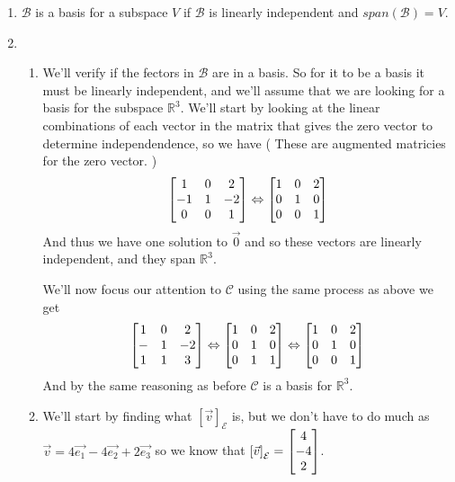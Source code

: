 \documentclass[11pt]{book}
\begin{document}
\begin{enumerate}
    \item $\mathcal{B}$ is a basis for a subspace $V$ if $\mathcal{B}$ is linearly independent and $\mathit{span} {\left( \mathcal{B} \right)}  = V$. 
    \item 
        \begin{enumerate}
            \item We'll verify if the fectors in $\mathcal{B}$ are in a basis. So for it to be a basis it must be linearly independent, and we'll assume that we are looking for a basis for the subspace $\mathbb{R}^{3}$. We'll start by looking at the linear combinations of each vector in the matrix that gives the zero vector to determine independendence, so we have ( These are augmented matricies for the zero vector. )
                \begin{gather*}
                    \begin{bmatrix} 1 & 0 & 2 \\ -1 & 1 & -2 \\ 0 & 0 & 1 \end{bmatrix} \Leftrightarrow \begin{bmatrix} 1 & 0 & 2 \\ 0 & 1 & 0 \\ 0 & 0 & 1 \end{bmatrix}
                \end{gather*}
                And thus we have one solution to $\vec{0}$ and so these vectors are linearly independent, and they span $\mathbb{R}^{3}$. 

                We'll now focus our attention to $\mathcal{C}$ using the same process as above we get
                \begin{equation*}
                    \begin{bmatrix} 1 & 0 & 2 \\ - & 1 & -2 \\ 1 & 1 & 3 \end{bmatrix} \Leftrightarrow \begin{bmatrix} 1 & 0 & 2 \\ 0 & 1 & 0 \\ 0 & 1 & 1 \end{bmatrix} \Leftrightarrow \begin{bmatrix} 1 & 0 & 2 \\ 0 & 1 & 0 \\ 0 & 0 & 1 \end{bmatrix}
                \end{equation*}
                And by the same reasoning as before $\mathcal{C}$  is a basis for $\mathbb{R}^{3}$. 
            \item We'll start by finding what $\left[ \vec{v} \right]_{\mathcal{E}}$ is, but we don't have to do much as $\vec{v} = 4\vec{e_1} - 4\vec{e_2} + 2\vec{e_3}$ so we know that $\left[ \vec{v} \right]_{\mathcal{E}} = \begin{bmatrix} 4 \\ -4 \\ 2 \end{bmatrix}$.


\end{enumerate}
\end{enumerate}
\end{document}
